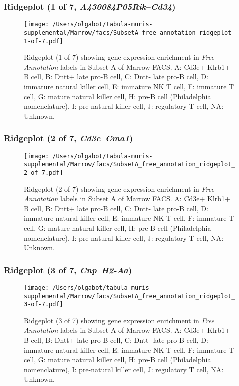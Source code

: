 \clearpage

\subsubsection{Ridgeplot (1 of 7, \emph{A430084P05Rik}--\emph{Cd34})}
\begin{figure}[h]
\centering
\texttt{[image: /Users/olgabot/tabula-muris-supplemental/Marrow/facs/SubsetA\_free\_annotation\_ridgeplot\_1-of-7.pdf]}

\caption{ Ridgeplot (1 of 7)  showing gene expression enrichment in \emph{Free Annotation} labels in Subset A of Marrow FACS. A: Cd3e+ Klrb1+ B cell, B: Dntt+ late pro-B cell, C: Dntt- late pro-B cell, D: immature natural killer cell, E: immature NK T cell, F: immature T cell, G: mature natural killer cell, H: pre-B cell (Philadelphia nomenclature), I: pre-natural killer cell, J: regulatory T cell, NA: Unknown.}
\end{figure}


\clearpage

\subsubsection{Ridgeplot (2 of 7, \emph{Cd3e}--\emph{Cma1})}
\begin{figure}[h]
\centering
\texttt{[image: /Users/olgabot/tabula-muris-supplemental/Marrow/facs/SubsetA\_free\_annotation\_ridgeplot\_2-of-7.pdf]}

\caption{ Ridgeplot (2 of 7)  showing gene expression enrichment in \emph{Free Annotation} labels in Subset A of Marrow FACS. A: Cd3e+ Klrb1+ B cell, B: Dntt+ late pro-B cell, C: Dntt- late pro-B cell, D: immature natural killer cell, E: immature NK T cell, F: immature T cell, G: mature natural killer cell, H: pre-B cell (Philadelphia nomenclature), I: pre-natural killer cell, J: regulatory T cell, NA: Unknown.}
\end{figure}


\clearpage

\subsubsection{Ridgeplot (3 of 7, \emph{Cnp}--\emph{H2-Aa})}
\begin{figure}[h]
\centering
\texttt{[image: /Users/olgabot/tabula-muris-supplemental/Marrow/facs/SubsetA\_free\_annotation\_ridgeplot\_3-of-7.pdf]}

\caption{ Ridgeplot (3 of 7)  showing gene expression enrichment in \emph{Free Annotation} labels in Subset A of Marrow FACS. A: Cd3e+ Klrb1+ B cell, B: Dntt+ late pro-B cell, C: Dntt- late pro-B cell, D: immature natural killer cell, E: immature NK T cell, F: immature T cell, G: mature natural killer cell, H: pre-B cell (Philadelphia nomenclature), I: pre-natural killer cell, J: regulatory T cell, NA: Unknown.}
\end{figure}


